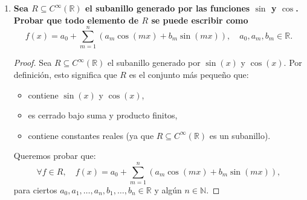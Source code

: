 \begin{ejemplo}
{\begin{enumerate}
\begin{observacion}
{			En efecto, para cada \( a \in I \), como \( g \equiv 0 \) en un entorno de \( a \), se cumple que
			\[
			g^{(n)}(a) = 0 \quad \text{para todo } n \in \mathbb{N}_0,
			\]
			donde \( g^{(n)} \) denota la \( n \)-ésima derivada de \( g \).
			
			Esto implica que el desarrollo en serie de Taylor de \( g \) alrededor de \( a \) es idénticamente cero:
			\[
			g(x) = \sum_{n=0}^\infty \frac{g^{(n)}(a)}{n!} (x - a)^n = 0.
			\]
			
			Como la función coincide con su serie de Taylor en un entorno de \( a \), \( g \) es nula en un entorno de cualquier punto \( a \in I \). Dado que \( I \) es un intervalo abierto, la función \( g \) es nula en una región abierta y conexa.
			
			Por continuidad e infinitas derivadas nulas en todo \( I \), \( g \) debe ser idénticamente cero en toda \(\mathbb{R}\), ya que una función suave con un conjunto abierto de ceros tiene que ser la función nula en todo su dominio (por la unicidad de la extensión analítica).
			
			Por tanto,
			\[
			g(x) = 0 \quad \text{para todo } x \in \mathbb{R}.
			\]
			
			Así, \( g \) es la función nula.
			}
		\end{observacion}
		
		
		\item \textbf{Sea \( R \subseteq C^\infty(\mathbb{R}) \) el subanillo generado por las funciones \( \sin \) y \( \cos \). Probar que todo elemento de \( R \) se puede escribir como}
		\[
		f(x) = a_0 + \sum_{m=1}^{n} (a_m \cos(mx) + b_m \sin(mx)), \quad a_0, a_m, b_m \in \mathbb{R}.
		\]
		
		\begin{proof}
			Sea \( R \subseteq C^\infty(\mathbb{R}) \) el subanillo generado por \( \sin(x) \) y \( \cos(x) \). Por definición, esto significa que \( R \) es el conjunto más pequeño que:
			
			\begin{itemize}
				\item contiene \( \sin(x) \) y \( \cos(x) \),
				\item es cerrado bajo suma y producto finitos,
				\item contiene constantes reales (ya que \( R \subseteq C^\infty(\mathbb{R}) \) es un subanillo).
			\end{itemize}
			
			Queremos probar que:
			\[
			\forall f \in R, \quad f(x) = a_0 + \sum_{m=1}^n (a_m \cos(mx) + b_m \sin(mx)),
			\]
			para ciertos \( a_0, a_1, \dots, a_n, b_1, \dots, b_n \in \mathbb{R} \) y algún \( n \in \mathbb{N} \).
			

\end{proof}
\end{enumerate}}
\end{ejemplo}
